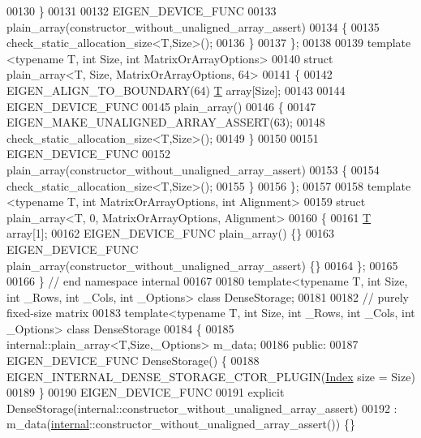 \begin{DoxyCode}
00130   \}
00131 
00132   EIGEN\_DEVICE\_FUNC
00133   plain\_array(constructor\_without\_unaligned\_array\_assert) 
00134   \{ 
00135     check\_static\_allocation\_size<T,Size>();
00136   \}
00137 \};
00138 
00139 \textcolor{keyword}{template} <\textcolor{keyword}{typename} T, \textcolor{keywordtype}{int} Size, \textcolor{keywordtype}{int} MatrixOrArrayOptions>
00140 \textcolor{keyword}{struct }plain\_array<T, Size, MatrixOrArrayOptions, 64>
00141 \{
00142   EIGEN\_ALIGN\_TO\_BOUNDARY(64) \hyperlink{group___sparse_core___module_class_eigen_1_1_triplet}{T} array[Size];
00143 
00144   EIGEN\_DEVICE\_FUNC
00145   plain\_array() 
00146   \{ 
00147     EIGEN\_MAKE\_UNALIGNED\_ARRAY\_ASSERT(63);
00148     check\_static\_allocation\_size<T,Size>();
00149   \}
00150 
00151   EIGEN\_DEVICE\_FUNC
00152   plain\_array(constructor\_without\_unaligned\_array\_assert) 
00153   \{ 
00154     check\_static\_allocation\_size<T,Size>();
00155   \}
00156 \};
00157 
00158 \textcolor{keyword}{template} <\textcolor{keyword}{typename} T, \textcolor{keywordtype}{int} MatrixOrArrayOptions, \textcolor{keywordtype}{int} Alignment>
00159 \textcolor{keyword}{struct }plain\_array<T, 0, MatrixOrArrayOptions, Alignment>
00160 \{
00161   \hyperlink{group___sparse_core___module_class_eigen_1_1_triplet}{T} array[1];
00162   EIGEN\_DEVICE\_FUNC plain\_array() \{\}
00163   EIGEN\_DEVICE\_FUNC plain\_array(constructor\_without\_unaligned\_array\_assert) \{\}
00164 \};
00165 
00166 \} \textcolor{comment}{// end namespace internal}
00167 
00180 \textcolor{keyword}{template}<\textcolor{keyword}{typename} T, \textcolor{keywordtype}{int} Size, \textcolor{keywordtype}{int} \_Rows, \textcolor{keywordtype}{int} \_Cols, \textcolor{keywordtype}{int} \_Options> \textcolor{keyword}{class }DenseStorage;
00181 
00182 \textcolor{comment}{// purely fixed-size matrix}
00183 \textcolor{keyword}{template}<\textcolor{keyword}{typename} T, \textcolor{keywordtype}{int} Size, \textcolor{keywordtype}{int} \_Rows, \textcolor{keywordtype}{int} \_Cols, \textcolor{keywordtype}{int} \_Options> \textcolor{keyword}{class }DenseStorage
00184 \{
00185     internal::plain\_array<T,Size,\_Options> m\_data;
00186   \textcolor{keyword}{public}:
00187     EIGEN\_DEVICE\_FUNC DenseStorage() \{
00188       EIGEN\_INTERNAL\_DENSE\_STORAGE\_CTOR\_PLUGIN(\hyperlink{namespace_eigen_a62e77e0933482dafde8fe197d9a2cfde}{Index} size = Size)
00189     \}
00190     EIGEN\_DEVICE\_FUNC
00191     \textcolor{keyword}{explicit} DenseStorage(internal::constructor\_without\_unaligned\_array\_assert)
00192       : m\_data(\hyperlink{namespaceinternal}{internal}::constructor\_without\_unaligned\_array\_assert()) \{\}

\end{DoxyCode}
